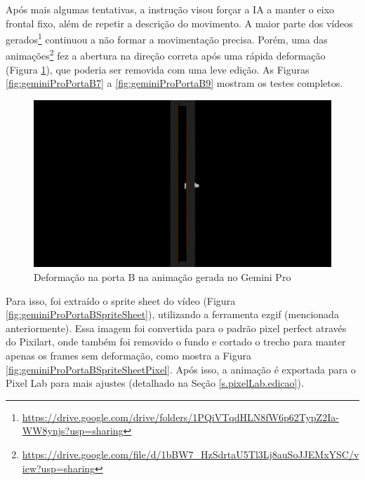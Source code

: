 Após mais algumas tentativas, a instrução visou forçar a IA a manter o eixo frontal fixo, além de repetir a descrição do movimento. A maior parte dos vídeos gerados\footnote{\url{https://drive.google.com/drive/folders/1PQiVTqdHLN8fW6p62TypZ2Ia-WW8ynjs?usp=sharing}} continuou a não formar a movimentação precisa. Porém, uma das animações\footnote{\url{https://drive.google.com/file/d/1bBW7_HzSdrtaU5Tl3Lj8auSoJJEMxYSC/view?usp=sharing}} fez a abertura na direção correta após uma rápida deformação (Figura \ref{fig:geminiProPortaBDeformacao}), que poderia ser removida com uma leve edição. As Figuras \ref{fig:geminiProPortaB7} a \ref{fig:geminiProPortaB9} mostram os testes completos.

\begin{figure}[htbp]
    \centering
    \caption{\small Deformação na porta B na animação gerada no Gemini Pro}
    \label{fig:geminiProPortaBDeformacao}
    \includegraphics[width=0.6\linewidth]{figs/geminiPro/chat7/portaDeformacao.jpg}
\end{figure}

Para isso, foi extraído o sprite sheet do vídeo (Figura \ref{fig:geminiProPortaBSpriteSheet}), utilizando a ferramenta ezgif (mencionada anteriormente). Essa imagem foi convertida para o padrão pixel perfect através do Pixilart, onde também foi removido o fundo e cortado o trecho para manter apenas os frames sem deformação, como mostra a Figura \ref{fig:geminiProPortaBSpriteSheetPixel}. Após isso, a animação é exportada para o Pixel Lab para mais ajustes (detalhado na Seção \ref{s.pixelLab.edicao}).

